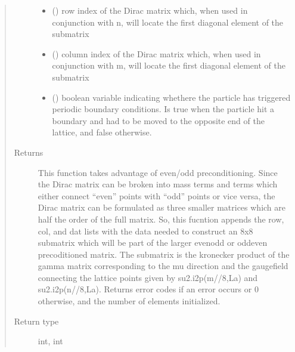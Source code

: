 \documentclass[letterpaper,10pt,english]{sphinxmanual}
\begin{document}
\begin{fulllineitems}
\begin{quote}
\begin{description}
\begin{itemize}
\item {} 
 () \textendash{} row index of the Dirac matrix which, when used in conjunction
with n, will locate the first diagonal element of the submatrix

\item {} 
 () \textendash{} column index of the Dirac matrix which, when used in
conjunction with m, will locate the first diagonal element of
the submatrix

\item {} 
 () \textendash{} boolean variable indicating whethere the particle has triggered
periodic boundary conditions. Is true when the particle hit a
boundary and had to be moved to the opposite end of the
lattice, and false otherwise.

\end{itemize}

\item[{Returns}] \leavevmode
This function takes advantage of even/odd preconditioning.
Since the Dirac matrix can be broken into mass terms and terms
which either connect “even” points with “odd” points or vice
versa, the Dirac matrix can be formulated as three smaller
matrices which are half the order of the full matrix. So, this
fucntion appends the row, col, and dat lists with the data
needed to construct an 8x8 submatrix which will be part of the
larger even\sphinxhyphen{}odd or odd\sphinxhyphen{}even precoditioned matrix. The submatrix
is the kronecker product of the gamma matrix corresponding to
the mu direction and the gaugefield connecting the lattice
points given by su2.i2p(m//8,La) and su2.i2p(n//8,La). Returns
error codes if an error occurs or 0 otherwise, and the number
of elements initialized.

\item[{Return type}] \leavevmode
int, int

\end{description}\end{quote}

\end{fulllineitems}

\end{document}
